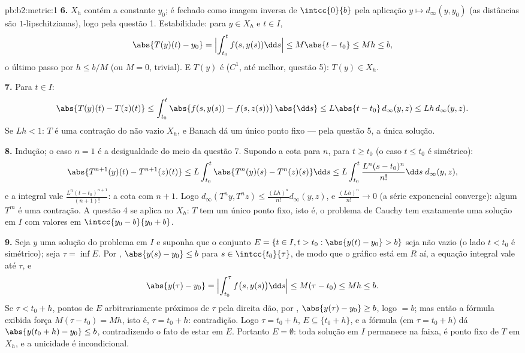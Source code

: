 \begin{solution}{pb:b2:metric:1}
\textbf{6.} $X_h$ contém a constante $y_0$; é fechado como
imagem inversa de $\intcc{0}{b}$ pela aplicação  $y
\mapsto d_\infty(y, y_0)$ (as distâncias são $1$-lipschitzianas), logo
 pela questão 1. Estabilidade: para $y \in X_h$ e $t \in
I$,
\[
\abs{T(y)(t) - y_0} = \Bigl|\int_{t_0}^{t}f(s, y(s))\dd s\Bigr|
\leq M\abs{t - t_0} \leq Mh \leq b ,
\]
o último passo por $h \leq b/M$ (ou $M = 0$, trivial). E $T(y)$
é  ($C^1$, até melhor, questão 5): $T(y) \in X_h$.

\textbf{7.} Para $t \in I$:
\[
\abs{T(y)(t) - T(z)(t)} \leq \int_{t_0}^{t}\abs{f(s, y(s)) -
f(s, z(s))}\,\abs{\dd s} \leq L\abs{t - t_0}\,d_\infty(y,z)
\leq Lh\,d_\infty(y,z).
\]
Se $Lh < 1$: $T$ é uma contração do  não vazio
$X_h$, e Banach dá um único ponto fixo --- pela questão 5,
a única solução.

\textbf{8.} Indução; o caso $n = 1$ é a desigualdade do meio da
questão 7. Supondo a cota para $n$, para $t \geq t_0$ (o
caso $t \leq t_0$ é simétrico):
\[
\abs{T^{n+1}(y)(t) - T^{n+1}(z)(t)}
\leq L\int_{t_0}^{t}\abs{T^n(y)(s) - T^n(z)(s)}\dd s
\leq L\int_{t_0}^{t}\frac{L^n(s - t_0)^n}{n!}\dd s\;
d_\infty(y,z),
\]
e a integral vale $\frac{L^n(t -
t_0)^{n+1}}{(n+1)!}$: a cota com $n + 1$. Logo
$d_\infty(T^n y, T^n z) \leq \frac{(Lh)^n}{n!}d_\infty(y, z)$,
e $\frac{(Lh)^n}{n!} \to 0$ (a série exponencial
converge): algum $T^m$ é uma contração. A questão 4 se aplica no
 $X_h$: $T$ tem um único ponto fixo, isto é, o
problema de Cauchy tem exatamente uma solução em $I$ com valores em
$\intcc{y_0 - b}{y_0 + b}$.

\textbf{9.} Seja $y$ uma solução do problema em $I$ e suponha que o conjunto
$E = \{t \in I, t > t_0 : \abs{y(t) - y_0} > b\}$ seja não vazio
(o lado $t < t_0$ é simétrico); seja $\tau = \inf E$. Por
, $\abs{y(s) - y_0} \leq b$ para $s \in
\intcc{t_0}{\tau}$, de modo que o gráfico está em $R$ aí, a equação
integral vale até $\tau$, e
\[
\abs{y(\tau) - y_0} = \Bigl|\int_{t_0}^{\tau}f\bigl(s,
y(s)\bigr)\dd s\Bigr| \leq M(\tau - t_0) \leq Mh \leq b .
\]
Se $\tau < t_0 + h$, pontos de $E$ arbitrariamente próximos de $\tau$
pela direita dão, por , $\abs{y(\tau) - y_0} \geq
b$, logo $= b$; mas então a fórmula exibida força $M(\tau - t_0) =
Mh$, isto é, $\tau = t_0 + h$: contradição. Logo $\tau = t_0 + h$,
$E \subseteq \{t_0 + h\}$, e a fórmula (em $\tau = t_0 + h$)
dá $\abs{y(t_0 + h) - y_0} \leq b$, contradizendo o fato de estar
em $E$. Portanto $E = \emptyset$: toda solução em $I$ permanece na
faixa, é ponto fixo de $T$ em $X_h$, e a unicidade é
incondicional.


\end{solution}
